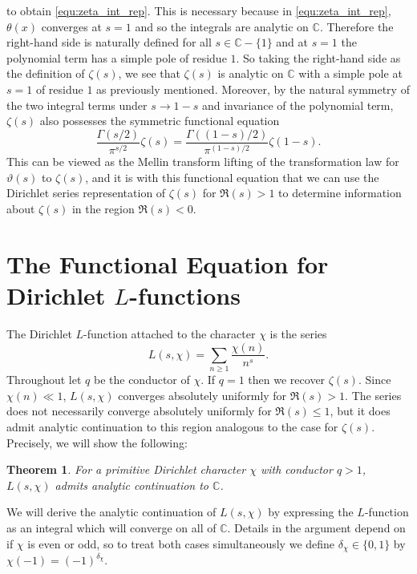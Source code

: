 \documentclass[12pt,reqno]{amsart}
\newtheorem{theorem}{Theorem}[section]
\theoremstyle{definition}
\numberwithin{equation}{section}
\newcommand{\C}{{\mathbb C}}
\begin{document}
    to obtain \ref{equ:zeta_int_rep}. This is necessary because in \ref{equ:zeta_int_rep}, $\theta(x)$ converges at $s = 1$ and so the integrals are analytic on $\C$. Therefore the right-hand side is naturally defined for all $s \in \mathbb{C}-\{1\}$ and at $s = 1$ the polynomial term has a simple pole of residue $1$. So taking the right-hand side as the definition of $\zeta(s)$, we see that $\zeta(s)$ is analytic on $\C$ with a simple pole at $s = 1$ of residue $1$ as previously mentioned. Moreover, by the natural symmetry of the two integral terms under $s \to 1-s$ and invariance of the polynomial term, $\zeta(s)$ also possesses the symmetric functional equation
    \[
        \frac{\Gamma\left(s/2\right)}{\pi^{s/2}}\zeta(s) = \frac{\Gamma\left((1-s)/2\right)}{\pi^{(1-s)/2}}\zeta(1-s).
    \]
    This can be viewed as the Mellin transform lifting of the transformation law for $\vartheta(s)$ to $\zeta(s)$, and it is with this functional equation that we can use the Dirichlet series representation of $\zeta(s)$ for $\Re(s) > 1$ to determine information about $\zeta(s)$ in the region $\Re(s) < 0$.

\section{The Functional Equation for Dirichlet \texorpdfstring{$L$}{L}-functions}
    The Dirichlet $L$-function attached to the character $\chi$ is the series
    \[
        L(s, \chi) = \sum_{n \ge 1}\frac{\chi(n)}{n^s}.
    \]
    Throughout let $q$ be the conductor of $\chi$. If $q = 1$ then we recover $\zeta(s)$. Since $\chi(n) \ll 1$, $L(s,\chi)$ converges absolutely uniformly for $\Re(s) > 1$. The series does not necessarily converge absolutely uniformly for $\Re(s) \le 1$, but it does admit analytic continuation to this region analogous to the case for $\zeta(s)$. Precisely, we will show the following:

    \begin{theorem}
        For a primitive Dirichlet character $\chi$ with conductor $q > 1$, $L(s,\chi)$ admits analytic continuation to $\C$.
    \end{theorem}

    We will derive the analytic continuation of $L(s,\chi)$ by expressing the $L$-function as an integral which will converge on all of $\C$. Details in the argument depend on if $\chi$ is even or odd, so to treat both cases simultaneously we define $\delta_{\chi} \in \{0,1\}$ by $\chi(-1) = (-1)^{\delta_{\chi}}$. 
    
\end{document}

